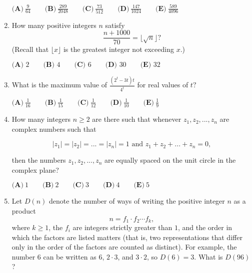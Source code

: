 \documentclass{article}
\begin{document}
\begin{enumerate}[label=\arabic*., itemsep=0.5em]
$\textbf{(A)}\ \frac{9}{64} \qquad\textbf{(B)}\ \frac{289}{2048} \qquad\textbf{(C)}\  \frac{73}{512} \qquad\textbf{(D)}\ \frac{147}{1024} \qquad\textbf{(E)}\ \frac{589}{4096}$\par \vspace{0.5em}\item How many positive integers $n$ satisfy
\begin{equation*}
\frac{n+1000}{70} = \lfloor \sqrt{n} \rfloor?
\end{equation*}
(Recall that $\lfloor x\rfloor$ is the greatest integer not exceeding $x$.)

$\textbf{(A) } 2 \qquad\textbf{(B) } 4 \qquad\textbf{(C) } 6 \qquad\textbf{(D) } 30 \qquad\textbf{(E) } 32$\par \vspace{0.5em}\item What is the maximum value of $\frac{(2^t-3t)t}{4^t}$ for real values of $t?$

$\textbf{(A)}\ \frac{1}{16} \qquad\textbf{(B)}\ \frac{1}{15} \qquad\textbf{(C)}\ \frac{1}{12} \qquad\textbf{(D)}\ \frac{1}{10} \qquad\textbf{(E)}\ \frac{1}{9}$\par \vspace{0.5em}\item How many integers $n \geq 2$ are there such that whenever $z_1, z_2, ..., z_n$ are complex numbers such that


\begin{equation*}
|z_1| = |z_2| = ... = |z_n| = 1 \text{    and    } z_1 + z_2 + ... + z_n = 0,
\end{equation*}

then the numbers $z_1, z_2, ..., z_n$ are equally spaced on the unit circle in the complex plane?

$\textbf{(A)}\ 1 \qquad\textbf{(B)}\ 2 \qquad\textbf{(C)}\ 3 \qquad\textbf{(D)}\ 4 \qquad\textbf{(E)}\ 5$\par \vspace{0.5em}\item Let $D(n)$ denote the number of ways of writing the positive integer $n$ as a product
\begin{equation*}
n = f_1\cdot f_2\cdots f_k,
\end{equation*}
where $k\ge1$, the $f_i$ are integers strictly greater than $1$, and the order in which the factors are listed matters (that is, two representations that differ only in the order of the factors are counted as distinct). For example, the number $6$ can be written as $6$, $2\cdot 3$, and $3\cdot2$, so $D(6) = 3$. What is $D(96)$?


\end{enumerate}
\end{document}
